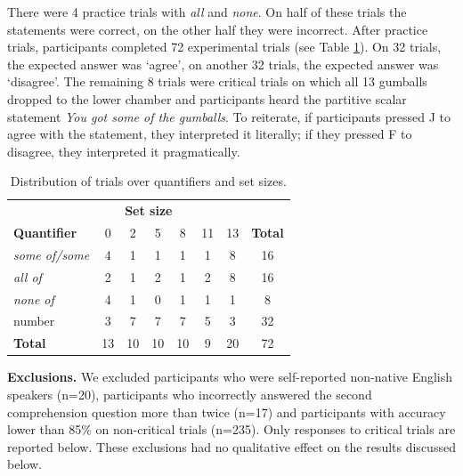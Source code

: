 \documentclass[10pt,letterpaper]{article}
\begin{document}
There were 4 practice trials with \textit{all} and \textit{none}. On half of these trials the statements were correct, on the other half they were incorrect. After  practice trials, participants completed 72 experimental trials (see Table \ref{tab:stimuli}). On 32   trials, the expected answer was `agree', on another 32 trials, the expected answer was `disagree'. The remaining 8 trials were  critical trials on which all 13 gumballs dropped to the lower chamber and participants heard the partitive scalar statement \emph{You got some of the gumballs}. To reiterate, if participants pressed J to agree with the statement, they interpreted it literally; if they pressed F to disagree, they interpreted it pragmatically.


  \begin{table}
      \begin{tabular}{lccccccc}
      \midrule
      \multicolumn{8}{c}{\textbf{Set size}} \\
      \textbf{Quantifier} & 0 & 2 & 5 & 8 & 11 & 13 & \multicolumn{1}{l}{\textbf{Total}} \\
      \midrule
      \textit{some of/some} & 4 & 1 & 1 & 1 & 1 & 8 & 16 \\
      \textit{all of} & 2 & 1 & 2 & 1 & 2 & 8 & 16 \\
      \textit{none of} & 4 & 1 & 0 & 1 & 1 & 1 & 8 \\
      number & 3 & 7 & 7 & 7 & 5 & 3 & 32 \\
      \bottomrule
      \textbf{Total} & 13 & 10 & 10 & 10 & 9 & 20 & 72
      \end{tabular}
    \caption{Distribution of  trials over quantifiers and set sizes. \label{tab:stimuli}}
  \end{table}
  
  
\noindent \textbf{Exclusions.} We excluded participants who were self-reported non-native English speakers (n=20), participants who incorrectly answered the second comprehension question more than twice (n=17) and participants with accuracy lower than 85\% on non-critical trials (n=235). Only responses to critical trials are reported below. These exclusions had no qualitative effect on the results discussed below.

 
\end{document}
